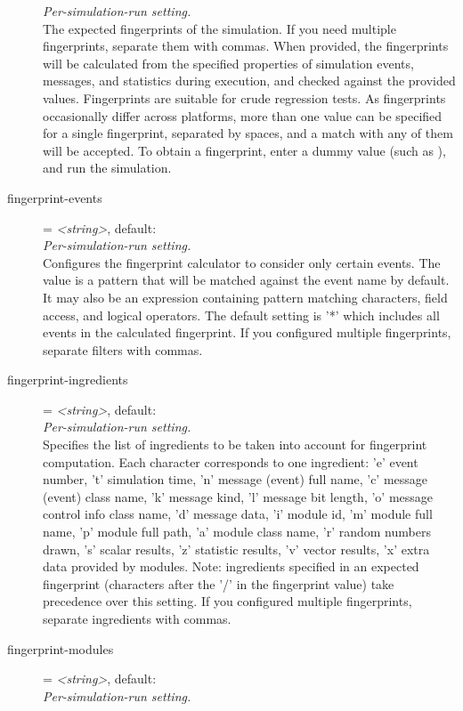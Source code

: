 \begin{description}
    \textit{Per-simulation-run setting.}\\
    The expected fingerprints of the simulation. If you need multiple
    fingerprints, separate them with commas. When provided, the fingerprints
    will be calculated from the specified properties of simulation events,
    messages, and statistics during execution, and checked against the provided
    values. Fingerprints are suitable for crude regression tests. As
    fingerprints occasionally differ across platforms, more than one value can
    be specified for a single fingerprint, separated by spaces, and a match
    with any of them will be accepted. To obtain a fingerprint, enter a dummy
    value (such as ), and run the simulation.
\item[fingerprint-events] = \textit{<string>}, default: \ttt{*}\\
    \textit{Per-simulation-run setting.}\\
    Configures the fingerprint calculator to consider only certain events. The
    value is a pattern that will be matched against the event name by default.
    It may also be an expression containing pattern matching characters, field
    access, and logical operators. The default setting is '*' which includes
    all events in the calculated fingerprint. If you configured multiple
    fingerprints, separate filters with commas.
\item[fingerprint-ingredients] = \textit{<string>}, default: \\
    \textit{Per-simulation-run setting.}\\
    Specifies the list of ingredients to be taken into account for fingerprint
    computation. Each character corresponds to one ingredient: 'e' event
    number, 't' simulation time, 'n' message (event) full name, 'c' message
    (event) class name, 'k' message kind, 'l' message bit length, 'o' message
    control info class name, 'd' message data, 'i' module id, 'm' module full
    name, 'p' module full path, 'a' module class name, 'r' random numbers
    drawn, 's' scalar results, 'z' statistic results, 'v' vector results, 'x'
    extra data provided by modules. Note: ingredients specified in an expected
    fingerprint (characters after the '/' in the fingerprint value) take
    precedence over this setting. If you configured multiple fingerprints,
    separate ingredients with commas.
\item[fingerprint-modules] = \textit{<string>}, default: \ttt{*}\\
    \textit{Per-simulation-run setting.}\\

\end{description}
